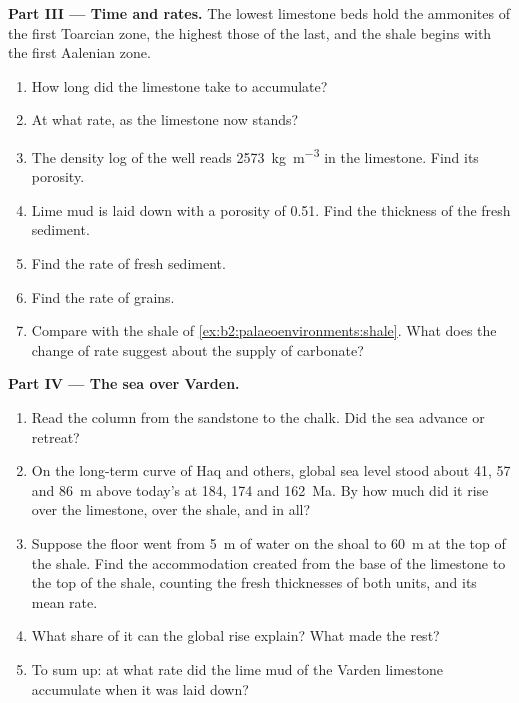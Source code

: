 \begin{problem}
\medskip\noindent\textbf{Part III --- Time and rates.} The lowest limestone beds hold the
ammonites of the first Toarcian zone, the highest those of the last, and the shale begins with
the first Aalenian zone.
\begin{enumerate}[resume]
  \item How long did the limestone take to accumulate?
  \item At what rate, as the limestone now stands?
  \item The density log of the well reads \qty{2573}{kg.m^{-3}} in the limestone. Find its
        porosity.
  \item Lime mud is laid down with a porosity of 0.51. Find the thickness of the fresh sediment.
  \item Find the rate of fresh sediment.
  \item Find the rate of grains.
  \item Compare with the shale of \cref{ex:b2:palaeoenvironments:shale}. What does the change of
        rate suggest about the supply of carbonate?
\end{enumerate}

\medskip\noindent\textbf{Part IV --- The sea over Varden.}
\begin{enumerate}[resume]
  \item Read the column from the sandstone to the chalk. Did the sea advance or retreat?
  \item On the long-term curve of Haq and others, global sea level stood about 41, 57 and
        \qty{86}{m} above today's at 184, 174 and \qty{162}{Ma}. By how much did it rise over the
        limestone, over the shale, and in all?
  \item Suppose the floor went from \qty{5}{m} of water on the shoal to \qty{60}{m} at the top of
        the shale. Find the accommodation created from the base of the limestone to the top of the
        shale, counting the fresh thicknesses of both units, and its mean rate.
  \item What share of it can the global rise explain? What made the rest?
  \item To sum up: at what rate did the lime mud of the Varden limestone accumulate when it was
        laid down?
\end{enumerate}
\end{problem}
